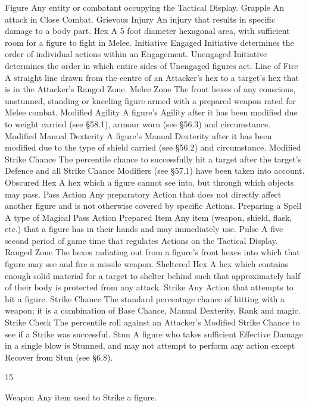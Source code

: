\documentclass[a4paper]{article}
\begin{document}
\begin{multicols}{3}
Figure Any entity or combatant occupying the
Tactical Display.
Grapple An attack in Close Combat.
Grievous Injury An injury that results in specific
damage to a body part.
Hex A 5 foot diameter hexagonal area, with sufficient room for a figure to fight in Melee.
Initiative Engaged Initiative determines the order
of individual actions within an Engagement. Unengaged Initiative determines the order in which
entire sides of Unengaged figures act.
Line of Fire A straight line drawn from the centre
of an Attacker’s hex to a target’s hex that is in the
Attacker’s Ranged Zone.
Melee Zone The front hexes of any conscious,
unstunned, standing or kneeling figure armed with
a prepared weapon rated for Melee combat.
Modified Agility A figure’s Agility after it has
been modified due to weight carried (see §58.1),
armour worn (see §56.3) and circumstance.
Modified Manual Dexterity A figure’s Manual
Dexterity after it has been modified due to the type
of shield carried (see §56.2) and circumstance.
Modified Strike Chance The percentile chance to
successfully hit a target after the target’s Defence
and all Strike Chance Modifiers (see §57.1) have
been taken into account.
Obscured Hex A hex which a figure cannot see
into, but through which objects may pass.
Pass Action Any preparatory Action that does not
directly affect another figure and is not otherwise
covered by specific Actions.
Preparing a Spell A type of Magical Pass Action
Prepared Item Any item (weapon, shield, flask,
etc.) that a figure has in their hands and may immediately use.
Pulse A five second period of game time that regulates Actions on the Tactical Display.
Ranged Zone The hexes radiating out from a
figure’s front hexes into which that figure may see
and fire a missile weapon.
Sheltered Hex A hex which contains enough solid
material for a target to shelter behind such that
approximately half of their body is protected from
any attack.
Strike Any Action that attempts to hit a figure.
Strike Chance The standard percentage chance of
hitting with a weapon; it is a combination of Base
Chance, Manual Dexterity, Rank and magic.
Strike Check The percentile roll against an Attacker’s Modified Strike Chance to see if a Strike
was successful.
Stun A figure who takes sufficient Effective Damage in a single blow is Stunned, and may not attempt to perform any action except Recover from
Stun (see §6.8).

15

Weapon Any item used to Strike a figure.


\end{multicols}
\end{document}
